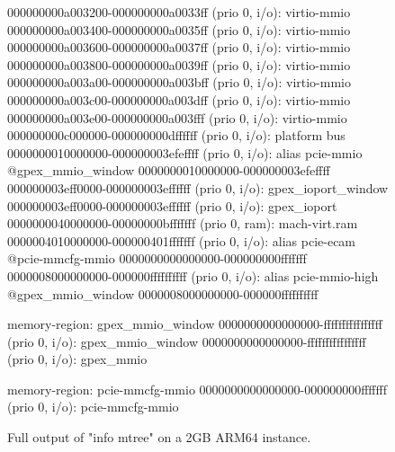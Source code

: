 \begin{figure}[ht]
\begin{minipage}{0.48\linewidth}
\begin{ffcode}
        000000000a003200-000000000a0033ff (prio 0, i/o): virtio-mmio
        000000000a003400-000000000a0035ff (prio 0, i/o): virtio-mmio
        000000000a003600-000000000a0037ff (prio 0, i/o): virtio-mmio
        000000000a003800-000000000a0039ff (prio 0, i/o): virtio-mmio
        000000000a003a00-000000000a003bff (prio 0, i/o): virtio-mmio
        000000000a003c00-000000000a003dff (prio 0, i/o): virtio-mmio
        000000000a003e00-000000000a003fff (prio 0, i/o): virtio-mmio
        000000000c000000-000000000dffffff (prio 0, i/o): platform bus
        0000000010000000-000000003efeffff (prio 0, i/o): alias pcie-mmio @gpex_mmio_window 0000000010000000-000000003efeffff
        000000003eff0000-000000003effffff (prio 0, i/o): gpex_ioport_window
          000000003eff0000-000000003effffff (prio 0, i/o): gpex_ioport
        0000000040000000-00000000bfffffff (prio 0, ram): mach-virt.ram
        0000004010000000-000000401fffffff (prio 0, i/o): alias pcie-ecam @pcie-mmcfg-mmio 0000000000000000-000000000fffffff
        0000008000000000-000000ffffffffff (prio 0, i/o): alias pcie-mmio-high @gpex_mmio_window 0000008000000000-000000ffffffffff

    memory-region: gpex_mmio_window
      0000000000000000-ffffffffffffffff (prio 0, i/o): gpex_mmio_window
        0000000000000000-ffffffffffffffff (prio 0, i/o): gpex_mmio

    memory-region: pcie-mmcfg-mmio
      0000000000000000-000000000fffffff (prio 0, i/o): pcie-mmcfg-mmio
  \end{ffcode}
  \end{minipage}
  \caption{Full output of "info mtree" on a 2GB ARM64 instance.}
  \label{fig:mem_ARM_full}
\end{figure}